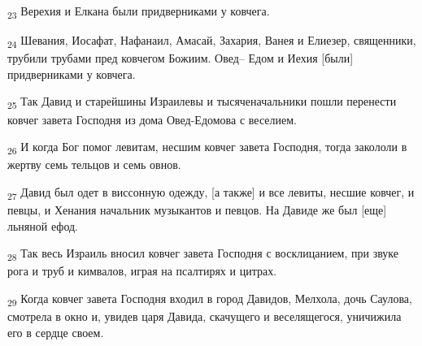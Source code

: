 \begin{tcolorbox}
\textsubscript{23} Верехия и Елкана были придверниками у ковчега.
\end{tcolorbox}
\begin{tcolorbox}
\textsubscript{24} Шевания, Иосафат, Нафанаил, Амасай, Захария, Ванея и Елиезер, священники, трубили трубами пред ковчегом Божиим. Овед-- Едом и Иехия [были] придверниками у ковчега.
\end{tcolorbox}
\begin{tcolorbox}
\textsubscript{25} Так Давид и старейшины Израилевы и тысяченачальники пошли перенести ковчег завета Господня из дома Овед-Едомова с веселием.
\end{tcolorbox}
\begin{tcolorbox}
\textsubscript{26} И когда Бог помог левитам, несшим ковчег завета Господня, тогда закололи в жертву семь тельцов и семь овнов.
\end{tcolorbox}
\begin{tcolorbox}
\textsubscript{27} Давид был одет в виссонную одежду, [а также] и все левиты, несшие ковчег, и певцы, и Хенания начальник музыкантов и певцов. На Давиде же был [еще] льняной ефод.
\end{tcolorbox}
\begin{tcolorbox}
\textsubscript{28} Так весь Израиль вносил ковчег завета Господня с восклицанием, при звуке рога и труб и кимвалов, играя на псалтирях и цитрах.
\end{tcolorbox}
\begin{tcolorbox}
\textsubscript{29} Когда ковчег завета Господня входил в город Давидов, Мелхола, дочь Саулова, смотрела в окно и, увидев царя Давида, скачущего и веселящегося, уничижила его в сердце своем.
\end{tcolorbox}
